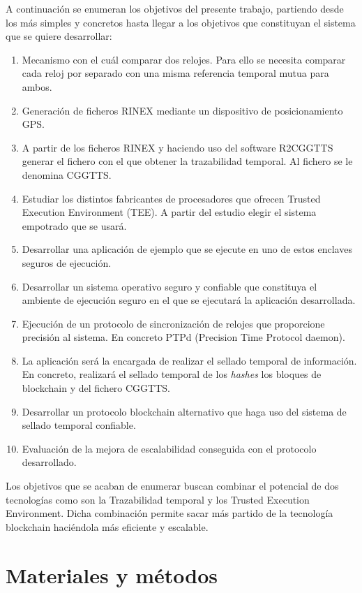 A continuación se enumeran los objetivos del presente trabajo, partiendo desde los más simples y concretos hasta llegar a los objetivos que constituyan el sistema que se quiere desarrollar:

\begin{enumerate}
	\item Mecanismo con el cuál comparar dos relojes. Para ello se necesita comparar cada reloj por separado con una misma referencia temporal mutua para ambos.
	\item Generación de ficheros RINEX mediante un dispositivo de posicionamiento GPS.
	\item A partir de los ficheros RINEX y haciendo uso del software R2CGGTTS generar el fichero con el que obtener la trazabilidad temporal. Al fichero se le denomina CGGTTS.
	\item Estudiar los distintos fabricantes de procesadores que ofrecen Trusted Execution Environment (TEE). A partir del estudio elegir el sistema empotrado que se usará.
	\item Desarrollar una aplicación de ejemplo que se ejecute en uno de estos enclaves seguros de ejecución.
	\item Desarrollar un sistema operativo seguro y confiable que constituya el ambiente de ejecución seguro en el que se ejecutará la aplicación desarrollada.
	\item Ejecución de un protocolo de sincronización de relojes que proporcione precisión al sistema. En concreto PTPd (Precision Time Protocol daemon).
	\item La aplicación será la encargada de realizar el sellado temporal de información. En concreto, realizará el sellado temporal de los \textit{hashes} los bloques de blockchain y del fichero CGGTTS.
	\item Desarrollar un protocolo blockchain alternativo que haga uso del sistema de sellado temporal confiable.
	\item Evaluación de la mejora de escalabilidad conseguida con el protocolo desarrollado.
\end{enumerate}

Los objetivos que se acaban de enumerar buscan combinar el potencial de dos tecnologías como son la Trazabilidad temporal y los Trusted Execution Environment. Dicha combinación permite sacar más partido de la tecnología blockchain haciéndola más eficiente y escalable.

\section{Materiales y métodos}


